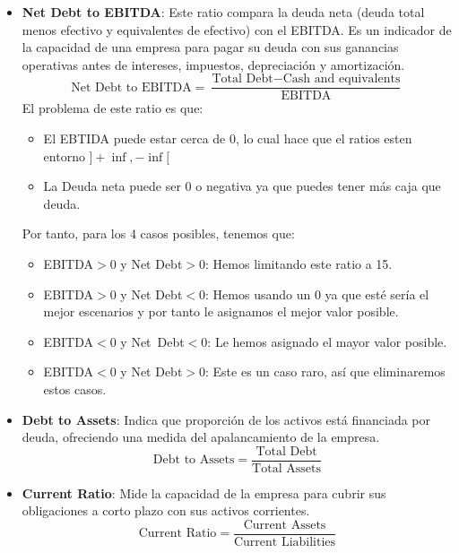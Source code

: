 \documentclass{article}
\begin{document}
\begin{itemize}
    \item \textbf{Net Debt to EBITDA}: Este ratio compara la deuda neta (deuda total menos efectivo y equivalentes de efectivo) con el EBITDA. Es un indicador de la capacidad de una empresa para pagar su deuda con sus ganancias operativas antes de intereses, impuestos, depreciación y amortización.
    \begin{equation*}
        \text{Net Debt to EBITDA} = \frac{\text{Total Debt} - \text{Cash and equivalents}}{\text{EBITDA}}
    \end{equation*}
     El problema de este ratio es que:
     \begin{itemize}
         \item El EBTIDA puede estar cerca de 0, lo cual hace que el ratios esten entorno $]+\inf, -\inf[$
        \item La Deuda neta puede ser 0 o negativa ya que puedes tener más caja que deuda.
     \end{itemize}
     Por tanto, para los 4 casos posibles, tenemos que:
      \begin{itemize}
         \item EBITDA$ > 0$ y Net Debt$ > 0$: Hemos limitando este ratio a 15.
         \item EBITDA$ > 0$ y Net Debt$ < 0$: Hemos usando un 0 ya que esté sería el mejor escenarios y por tanto le asignamos el mejor valor posible.
         \item EBITDA$ < 0$ y Net\ Debt$ < 0$: Le hemos asignado el mayor valor posible.
         \item EBITDA$ < 0$ y Net Debt$ > 0$: Este es un caso raro, así que eliminaremos estos casos.
    \end{itemize}
    
    \item \textbf{Debt to Assets}: Indica que proporción de los activos está financiada por deuda, ofreciendo una medida del apalancamiento de la empresa.
    \begin{equation*}
        \text{Debt to Assets} = \frac{\text{Total Debt}}{\text{Total Assets}}
    \end{equation*}
    
    \item \textbf{Current Ratio}: Mide la capacidad de la empresa para cubrir sus obligaciones a corto plazo con sus activos corrientes.
    \begin{equation*}
        \text{Current Ratio} = \frac{\text{Current Assets}}{\text{Current Liabilities}}
    \end{equation*}
    

\end{itemize}
\end{document}
